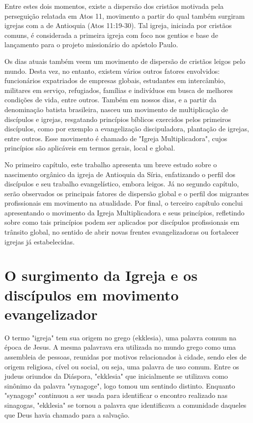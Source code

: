 \documentclass[12pt,openright,oneside,a4paper,
english,french,spanish,brazil]{abntex2}
\begin{document}
Entre estes dois momentos, existe a dispersão dos cristãos motivada pela perseguição relatada em Atos 11, movimento a partir do qual também surgiram igrejas com a de Antioquia (Atos 11:19-30). Tal igreja, iniciada por cristãos comuns, é considerada a primeira igreja com foco nos gentios e base de lançamento para o projeto missionário do apóstolo Paulo.
	
Os dias atuais também veem um movimento de dispersão de cristãos leigos pelo mundo. Desta vez, no entanto, existem vários outros fatores envolvidos:  funcionários expatriados de empresas globais, estudantes em intercâmbio, militares em serviço, refugiados, famílias e indivíduos em busca de melhores condições de vida, entre outros. Também em nossos dias, e a partir da denominação batista brasileira, nasceu um movimento de multiplicação de discípulos e igrejas, resgatando princípios bíblicos exercidos pelos primeiros discípulos, como por exemplo a evangelização discipuladora, plantação de igrejas, entre outros. Esse movimento é chamado de "Igreja Multiplicadora", cujos princípios são aplicáveis em termos gerais, local e global.

No primeiro capítulo, este trabalho apresenta um breve estudo sobre o nascimento orgânico da igreja de Antioquia da Síria, enfatizando o perfil dos discípulos e seu trabalho evangelístico, embora leigos. Já no segundo capítulo, serão observados os principais fatores de dispersão global e o perfil dos migrantes profissionais em movimento na atualidade. Por final, o terceiro capítulo conclui apresentando o movimento da Igreja Multiplicadora e seus princípios, refletindo sobre como tais princípios podem ser aplicados por discípulos profissionais em trânsito global, no sentido de abrir novas frentes evangelizadoras ou fortalecer igrejas já estabelecidas.

\chapter{O surgimento da Igreja e os discípulos em movimento evangelizador}

O termo "igreja" tem sua origem no grego (ekklesia), uma palavra comum na época de Jesus. A mesma palavrava era utilizada no mundo grego como uma assembleia de pessoas, reunidas por motivos relacionados à cidade, sendo eles de origem religiosa, cível ou social, ou seja, uma palavra de uso comum\cite[p. 317]{zac}. Entre os judeus oriundos da Diáspora, "ekklesia" que inicialmente se utilizava como sinônimo da palavra "synagoge", logo tomou um sentindo distinto. Enquanto "synagoge" continuou a ser usada para identificar o encontro realizado nas sinagogas, "ekklesia" se tornou a palavra que identificava a comunidade daqueles que Deus havia chamado para a salvação\cite[p. 485]{bavinck}. 
\end{document}
